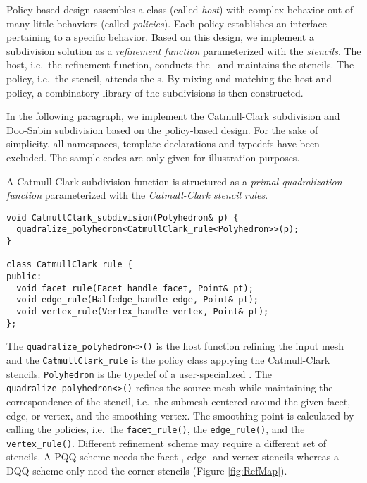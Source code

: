 Policy-based design \cite{Alexandrescu:2001:MCD} assembles a 
class (called \emph{host}) with complex behavior out of many 
little behaviors (called \emph{policies}). Each policy establishes
an interface pertaining to a specific behavior.
Based on this design, we implement a subdivision solution as 
a \emph{refinement function} parameterized with the 
\emph{stencils}. The host, i.e.\ the refinement function,
conducts the \tr\ and maintains the stencils. The policy,
i.e.\ the stencil, attends the \gm s. By mixing and matching
the host and policy, a combinatory library of the subdivisions
is then constructed. 

In the following paragraph, we implement the Catmull-Clark 
subdivision and Doo-Sabin subdivision based on the 
policy-based design. For the sake of simplicity, all 
namespaces, template declarations
and typedefs have been excluded. The sample codes are only
given for illustration purposes.

A Catmull-Clark subdivision function is structured 
as a \emph{primal quadralization function} parameterized 
with the \emph{Catmull-Clark stencil rules}.
\begin{lstlisting}
void CatmullClark_subdivision(Polyhedron& p) {
  quadralize_polyhedron<CatmullClark_rule<Polyhedron>>(p);
}

class CatmullClark_rule {
public:
  void facet_rule(Facet_handle facet, Point& pt);
  void edge_rule(Halfedge_handle edge, Point& pt);
  void vertex_rule(Vertex_handle vertex, Point& pt);
};
\end{lstlisting}
The \lstinline!quadralize_polyhedron<>()! is the host function
refining the input mesh
and the \lstinline!CatmullClark_rule!
is the policy class applying the Catmull-Clark stencils.
\lstinline!Polyhedron! is the typedef of a user-specialized
\cgalpoly . The \lstinline!quadralize_polyhedron<>()!
refines the source mesh while maintaining the 
correspondence of the stencil, i.e.\ the submesh centered 
around the given facet, edge, or
vertex, and the smoothing vertex. The smoothing point
is calculated by calling the policies, i.e.\
the \lstinline!facet_rule()!, the \lstinline!edge_rule()!,
and the \lstinline!vertex_rule()!.
Different refinement scheme may require a 
different set of stencils. A PQQ scheme needs the
facet-, edge- and vertex-stencils whereas a DQQ scheme 
only need the corner-stencils (Figure \ref{fig:RefMap}).


